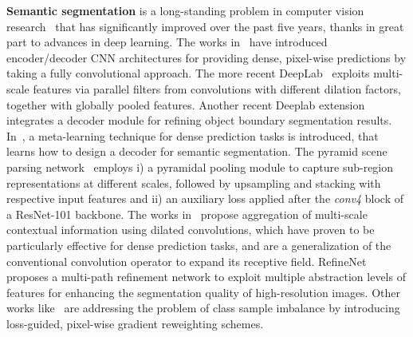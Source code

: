 \documentclass[10pt,twocolumn,letterpaper]{article}
\renewcommand{\paragraph}[1]{
        \vspace{3pt}
	\noindent\textbf{#1}}
\begin{document}
\paragraph{Semantic segmentation} is a long-standing problem in computer vision research~\cite{Shotton2007,Brostow2008,Krahenbuhl11,Kontschieder2014a} that has significantly improved over the past five years, thanks in great part to advances in deep learning. The works in~\cite{Badrinarayanan2015,Long2015} have introduced encoder/decoder CNN architectures for providing dense, pixel-wise predictions by taking \eg a fully convolutional approach. The more recent DeepLab~\cite{Chen2016} exploits multi-scale features via parallel filters from convolutions with different dilation factors, together with globally pooled features. Another recent Deeplab extension~\cite{Chen2018ECCV} integrates a decoder module for refining object boundary segmentation results. In~\cite{Chen2018NIPS}, a meta-learning technique for dense prediction tasks is introduced, that learns how to design a decoder for semantic segmentation. The pyramid scene parsing network~\cite{zhao2016pspnet} employs i) a pyramidal pooling module to capture sub-region representations at different scales, followed by upsampling and stacking with respective input features and ii) an auxiliary loss applied after the \textit{conv4} block of a ResNet-101 backbone. The works in~\cite{Yu2016,Yu_2017_CVPR} propose aggregation of multi-scale contextual information using dilated convolutions, which have proven to be particularly effective for dense prediction tasks, and are a generalization of the conventional convolution operator to expand its receptive field. RefineNet~\cite{Lin_2017_CVPR} proposes a multi-path refinement network to exploit multiple abstraction levels of features for enhancing the segmentation quality of high-resolution images. Other works like~\cite{Wu2016,RotNeuKon17cvpr} are addressing the problem of class sample imbalance by introducing loss-guided, pixel-wise gradient reweighting schemes.
\end{document}
